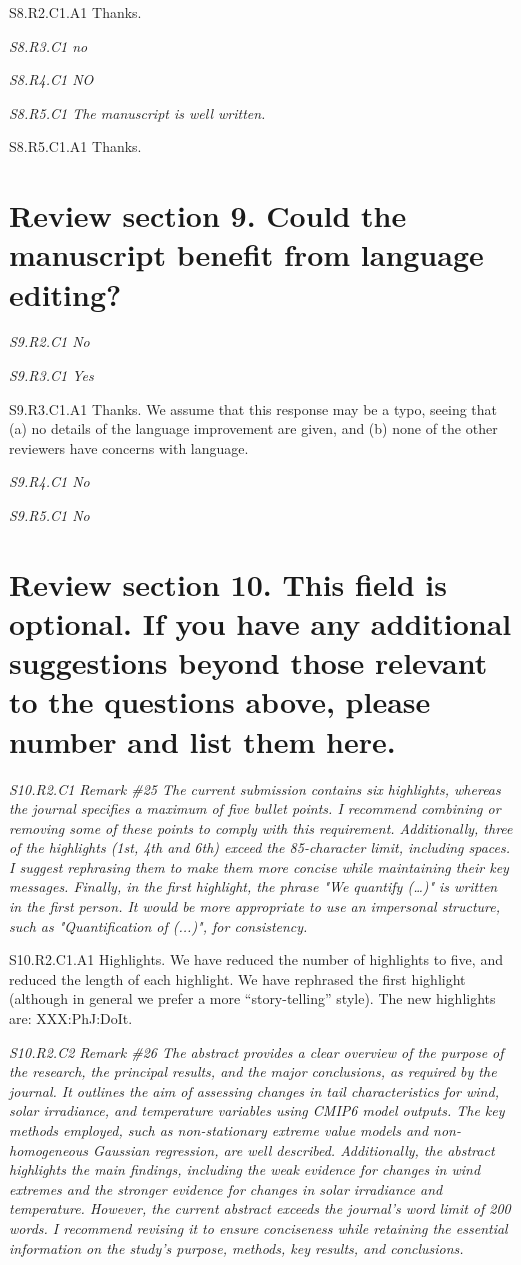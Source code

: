 \documentclass[a4paper,10pt]{article}
\begin{document}
	S8.R2.C1.A1 Thanks.

	\emph{S8.R3.C1 no}

	\emph{S8.R4.C1 NO}

	\emph{S8.R5.C1 The manuscript is well written.}

	S8.R5.C1.A1 Thanks.

	\section*{Review section 9. Could the manuscript benefit from language editing?}

	\emph{S9.R2.C1 No}

	\emph{S9.R3.C1 Yes}

	S9.R3.C1.A1 Thanks. We assume that this response may be a typo, seeing that (a) no details of the language improvement are given, and (b) none of the other reviewers have concerns with language.

	\emph{S9.R4.C1 No}

	\emph{S9.R5.C1 No}

	\section*{Review section 10. This field is optional. If you have any additional suggestions beyond those relevant to the questions above, please number and list them here.}

	\emph{S10.R2.C1 Remark \#25 The current submission contains six highlights, whereas the journal specifies a maximum of five bullet points. I recommend combining or removing some of these points to comply with this requirement. Additionally, three of the highlights (1st, 4th and 6th) exceed the 85-character limit, including spaces. I suggest rephrasing them to make them more concise while maintaining their key messages. Finally, in the first highlight, the phrase "We quantify (…)" is written in the first person. It would be more appropriate to use an impersonal structure, such as "Quantification of (...)", for consistency.}

	S10.R2.C1.A1 Highlights. We have reduced the number of highlights to five, and reduced the length of each highlight. We have rephrased the first highlight (although in general we prefer a more ``story-telling'' style). The new highlights are: XXX:PhJ:DoIt.

	\emph{S10.R2.C2 Remark \#26 The abstract provides a clear overview of the purpose of the research, the principal results, and the major conclusions, as required by the journal. It outlines the aim of assessing changes in tail characteristics for wind, solar irradiance, and temperature variables using CMIP6 model outputs. The key methods employed, such as non-stationary extreme value models and non-homogeneous Gaussian regression, are well described. Additionally, the abstract highlights the main findings, including the weak evidence for changes in wind extremes and the stronger evidence for changes in solar irradiance and temperature. However, the current abstract exceeds the journal's word limit of 200 words. I recommend revising it to ensure conciseness while retaining the essential information on the study's purpose, methods, key results, and conclusions.}
	
\end{document}
